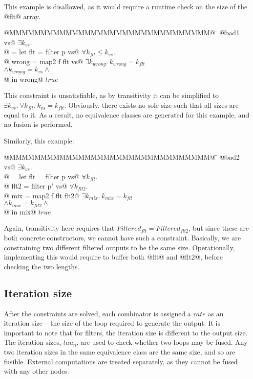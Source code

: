This example is disallowed, as it would require a runtime check on the size of the @flt@ array.
\begin{tabbing}
@MMMMMMMMMMMMMMMMMMMMMMMMMMMMMMMM@  \= \kill
@bad1 vs@                           \> $\exists k_{vs}.$ \\
@ = let flt   = filter p vs@        \> $\forall k_{flt} \le k_{vs}.$ \\
@       wrong = map2   f flt vs@    \> $\exists k_{wrong}.\ k_{wrong} = k_{flt}$ \\
                                    \> $\wedge k_{wrong} = k_{vs} \wedge$ \\
@   in  wrong@                      \> $true$
\end{tabbing}
This constraint is unsatisfiable, as by transitivity it can be simplified to $\exists k_{vs}.\ \forall k_{flt}.\ k_{vs} = k_{flt}$.
Obviously, there exists no sole size such that all sizes are equal to it.
As a result, no equivalence classes are generated for this example, and no fusion is performed.


Similarly, this example:
\begin{tabbing}
@MMMMMMMMMMMMMMMMMMMMMMMMMMMMMMMM@  \= \kill
@bad2 vs@                           \> $\exists k_{vs}.$ \\
@ = let flt  = filter p  vs@        \> $\forall k_{flt}.$ \\
@       flt2 = filter p' vs@        \> $\forall k_{flt2}.$ \\
@       mix  = map2   f  flt flt2@  \> $\exists k_{mix}.\ k_{mix} = k_{flt}$ \\
                                    \> $\wedge k_{mix} = k_{flt2} \wedge$ \\
@   in  mix@                        \> $true$                               \\
\end{tabbing}
Again, transitivity here requires that $Filtered_{flt} = Filtered_{flt2}$, but since these are both concrete constructors, we cannot have such a constraint.
Basically, we are constraining two different filtered outputs to be the same size.
Operationally, implementing this would require to buffer both @flt@ and @flt2@, before checking the two lengths.



\subsection{Iteration size}
After the constraints are solved, each combinator is assigned a $rate$ as an iteration size -- the size of the loop required to generate the output.
It is important to note that for filters, the iteration size is different to the output size.
The iteration sizes, $tau_n$, are used to check whether two loops may be fused.
Any two iteration sizes in the same equivalence class are the same size, and so are fusible.
External computations are treated separately, as they cannot be fused with any other nodes.


